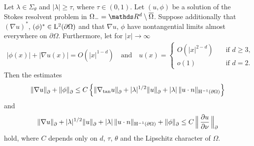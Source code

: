 \begin{thm}
  \label{thm:rellichExterior}
  Let $\lambda \in \Sigma_\theta$ and $|\lambda| \geq \tau$, where $\tau \in (0,1)$.
  Let $(u,\phi)$ be a solution of the Stokes resolvent problem in $\Omega_- = \R^d \setminus \overline\Omega$.
  Suppose additionally that $(\nabla u)^*$, $(\phi)^* \in \mathrm{L}^2(\partial\Omega)$ and that $\nabla u$, $\phi$ have nontangential limits almost everywhere on $\partial\Omega$.
  Furthermore, let for $|x| \to \infty$
  \begin{align*}
    |\phi(x)| + |\nabla u(x)| = O(|x|^{1 - d}) \quad\text{and}\quad 
    u(x) = \begin{cases} O(|x|^{2 - d}) &\quad\text{if } d \geq 3, \\ o(1) &\quad\text{if } d = 2. \end{cases}
  \end{align*}
  Then the estimates
  \begin{align}
    \label{eq:rellich1ext}
    \|\nabla u\|^{}_\partial + \|\phi\|^{}_\partial
    \leq C\, \Big\{ \|\nabla_{\mathrm{tan}} u\|^{}_\partial + |\lambda|^{1/2} \|u\|^{}_\partial + |\lambda|\, \|u \cdot n\|_{\mathrm{H}^{-1}(\partial\Omega)} \Big\}
  \end{align}
  and
  \begin{align}
    \label{eq:rellich2ext}
    \|\nabla u\|^{}_\partial + |\lambda|^{1/2} \|u\|^{}_\partial + |\lambda| \, \|u \cdot n\|_{\mathrm{H}^{-1}(\partial\Omega)} + \|\phi\|^{}_\partial
    \leq C \, \Big\|\,\frac{\partial u}{\partial \nu} \,\Big\|^{}_\partial
  \end{align}
  hold, where $C$ depends only on $d$, $\tau$, $\theta$ and the Lipschitz character of $\Omega$.
\end{thm}
